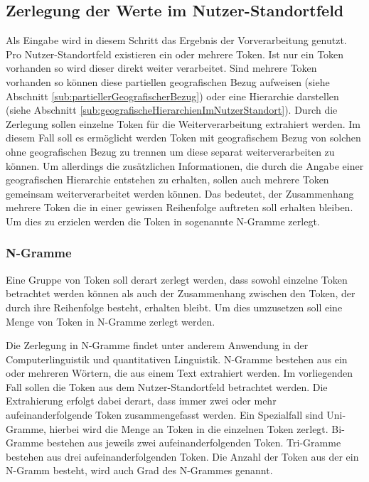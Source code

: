 		\subsection{Zerlegung der Werte im Nutzer-Standortfeld} \label{sub:VorvNGramme}

			Als Eingabe wird in diesem Schritt das Ergebnis der Vorverarbeitung genutzt. 
			Pro Nutzer-Standortfeld existieren ein oder mehrere Token. 
			Ist nur ein Token vorhanden so wird dieser direkt weiter verarbeitet.
			Sind mehrere Token vorhanden so können diese partiellen geografischen Bezug aufweisen (siehe Abschnitt \ref{sub:partiellerGeografischerBezug}) oder eine Hierarchie darstellen (siehe Abschnitt \ref{sub:geografischeHierarchienImNutzerStandort}).
			Durch die Zerlegung sollen einzelne Token für die Weiterverarbeitung extrahiert werden.
			Im diesem Fall soll es ermöglicht werden Token mit geografischem Bezug von solchen ohne geografischen Bezug zu trennen um diese separat weiterverarbeiten zu können.
			Um allerdings die zusätzlichen Informationen, die durch die Angabe einer geografischen Hierarchie entstehen zu erhalten, sollen auch mehrere Token gemeinsam weiterverarbeitet werden können.
			Das bedeutet, der Zusammenhang mehrere Token die in einer gewissen Reihenfolge auftreten soll erhalten bleiben. 
			Um dies zu erzielen werden die Token in sogenannte N-Gramme zerlegt. 

			\subsubsection{N-Gramme} 

				Eine Gruppe von Token soll derart zerlegt werden, dass sowohl einzelne Token betrachtet werden können als auch der Zusammenhang zwischen den Token, der durch ihre Reihenfolge  besteht, erhalten bleibt.
				Um dies umzusetzen soll eine Menge von Token in N-Gramme zerlegt werden.

				Die Zerlegung in N-Gramme findet unter anderem Anwendung in der Computerlinguistik und quantitativen Linguistik.
				N-Gramme bestehen aus ein oder mehreren Wörtern, die aus einem Text extrahiert werden. 
				Im vorliegenden Fall sollen die Token aus dem Nutzer-Standortfeld betrachtet werden.
				Die Extrahierung erfolgt dabei derart, dass immer zwei oder mehr aufeinanderfolgende Token zusammengefasst werden.    
				Ein Spezialfall sind Uni-Gramme, hierbei wird die Menge an Token in die einzelnen Token zerlegt.
				Bi-Gramme bestehen aus jeweils zwei aufeinanderfolgenden Token.
				Tri-Gramme bestehen aus drei aufeinanderfolgenden Token. 
				Die Anzahl der Token aus der ein N-Gramm besteht, wird auch Grad des N-Grammes genannt.

